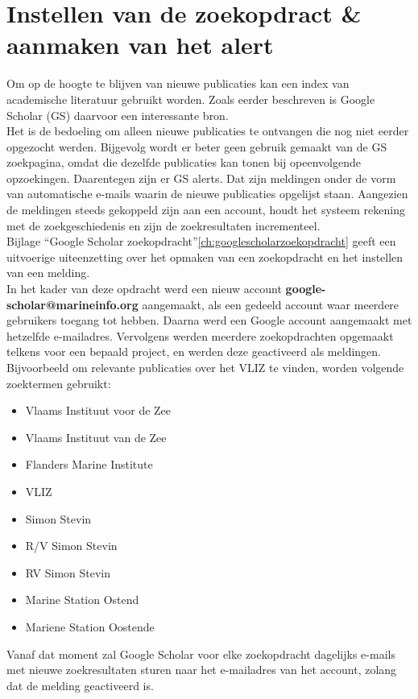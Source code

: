 \section{Instellen van de zoekopdract \& aanmaken van het alert}
Om op de hoogte te blijven van nieuwe publicaties kan een index van academische literatuur gebruikt worden. Zoals eerder beschreven is Google Scholar (GS) daarvoor een interessante bron.\\
Het is de bedoeling om alleen nieuwe publicaties te ontvangen die nog niet eerder opgezocht werden. Bijgevolg wordt er beter geen gebruik gemaakt van de GS zoekpagina, omdat die dezelfde publicaties kan tonen bij opeenvolgende opzoekingen. Daarentegen zijn er GS alerts. Dat zijn meldingen onder de vorm van automatische e-mails waarin de nieuwe publicaties opgelijst staan. Aangezien de meldingen steeds gekoppeld zijn aan een account, houdt het systeem rekening met de zoekgeschiedenis en zijn de zoekresultaten incrementeel.\\
Bijlage ``Google Scholar zoekopdracht''\ref{ch:googlescholarzoekopdracht} geeft een uitvoerige uiteenzetting over het opmaken van een zoekopdracht en het instellen van een melding.\\
In het kader van deze opdracht werd een nieuw account \textbf{google-scholar@marineinfo.org} aangemaakt, als een gedeeld account waar meerdere gebruikers toegang tot hebben. Daarna werd een Google account aangemaakt met hetzelfde e-mailadres. Vervolgens werden meerdere zoekopdrachten opgemaakt telkens voor een bepaald project, en werden deze geactiveerd als meldingen.\\
Bijvoorbeeld om relevante publicaties over het VLIZ te vinden, worden volgende zoektermen gebruikt:
\begin{itemize}
    \item Vlaams Instituut voor de Zee
    \item Vlaams Instituut van de Zee
    \item Flanders Marine Institute
    \item VLIZ
    \item Simon Stevin
    \item R/V Simon Stevin
    \item RV Simon Stevin
    \item Marine Station Ostend
    \item Mariene Station Oostende
\end{itemize}

Vanaf dat moment zal Google Scholar voor elke zoekopdracht dagelijks e-mails met nieuwe zoekresultaten sturen naar het e-mailadres van het account, zolang dat de melding geactiveerd is.